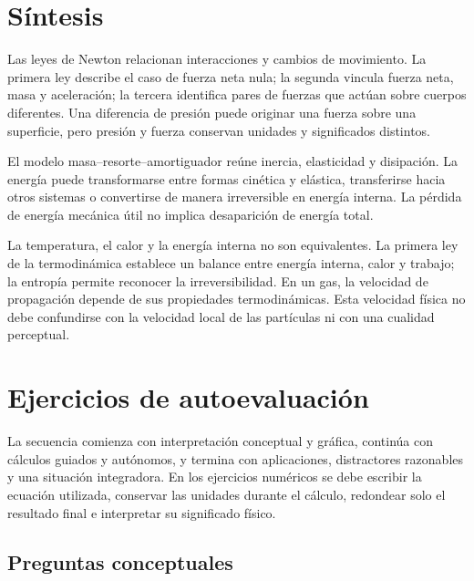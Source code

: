 \section{Síntesis}
\label{sec:u2-sintesis}

Las leyes de Newton relacionan interacciones y cambios de movimiento. La primera ley describe el caso de fuerza neta nula; la segunda vincula fuerza neta, masa y aceleración; la tercera identifica pares de fuerzas que actúan sobre cuerpos diferentes. Una diferencia de presión puede originar una fuerza sobre una superficie, pero presión y fuerza conservan unidades y significados distintos.

El modelo masa--resorte--amortiguador reúne inercia, elasticidad y disipación. La energía puede transformarse entre formas cinética y elástica, transferirse hacia otros sistemas o convertirse de manera irreversible en energía interna. La pérdida de energía mecánica útil no implica desaparición de energía total.

La temperatura, el calor y la energía interna no son equivalentes. La primera ley de la termodinámica establece un balance entre energía interna, calor y trabajo; la entropía permite reconocer la irreversibilidad. En un gas, la velocidad de propagación depende de sus propiedades termodinámicas. Esta velocidad física no debe confundirse con la velocidad local de las partículas ni con una cualidad perceptual.

\section{Ejercicios de autoevaluación}
\label{sec:u2-ejercicios}

La secuencia comienza con interpretación conceptual y gráfica, continúa con
cálculos guiados y autónomos, y termina con aplicaciones, distractores
razonables y una situación integradora. En los ejercicios numéricos se debe
escribir la ecuación utilizada, conservar las unidades durante el cálculo,
redondear solo el resultado final e interpretar su significado físico.

\subsection*{Preguntas conceptuales}

